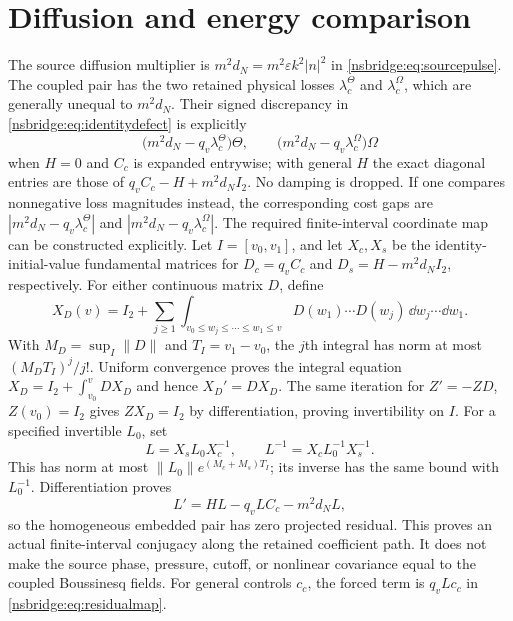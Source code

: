 \section{Diffusion and energy comparison}
The source diffusion multiplier is $m^2d_N=m^2\varepsilon k^2|n|^2$ in
\eqref{nsbridge:eq:sourcepulse}.  The coupled pair has the two retained physical losses
$\lambda_c^\Theta$ and $\lambda_c^\Omega$, which are generally unequal to
$m^2d_N$.  Their signed discrepancy in \eqref{nsbridge:eq:identitydefect} is explicitly
\begin{equation}
 \bigl(m^2d_N-q_v\lambda_c^\Theta\bigr)\Theta,
 \qquad
 \bigl(m^2d_N-q_v\lambda_c^\Omega\bigr)\Omega
\end{equation}
when $H=0$ and $C_c$ is expanded entrywise; with general $H$ the exact
diagonal entries are those of $q_vC_c-H+m^2d_NI_2$.  No damping is dropped.
If one compares nonnegative loss magnitudes instead, the corresponding cost
gaps are $|m^2d_N-q_v\lambda_c^\Theta|$ and
$|m^2d_N-q_v\lambda_c^\Omega|$.
The required finite-interval coordinate map can be constructed explicitly.
Let $I=[v_0,v_1]$, and let $X_c,X_s$ be the identity-initial-value
fundamental matrices for $D_c=q_vC_c$ and $D_s=H-m^2d_NI_2$,
respectively. For either continuous matrix $D$, define
\[
 X_D(v)=I_2+\sum_{j\ge1}
 \int_{v_0\le w_j\le\cdots\le w_1\le v}
 D(w_1)\cdots D(w_j)\,\dd w_j\cdots\dd w_1 .
\]
With $M_D=\sup_I\|D\|$ and $T_I=v_1-v_0$, the $j$th integral has norm
at most $(M_DT_I)^j/j!$. Uniform convergence proves the integral equation
$X_D=I_2+\int_{v_0}^vDX_D$ and hence $X_D'=DX_D$.
The same iteration for $Z'=-ZD$, $Z(v_0)=I_2$ gives $ZX_D=I_2$
by differentiation, proving invertibility on $I$. For a specified
invertible $L_0$, set
\[
 L=X_sL_0X_c^{-1},\qquad L^{-1}=X_cL_0^{-1}X_s^{-1}.
\]
This has norm at most $\|L_0\|e^{(M_c+M_s)T_I}$; its inverse has the
same bound with $L_0^{-1}$. Differentiation proves
\begin{equation}
 L'=HL-q_vLC_c-m^2d_NL,
 \label{nsbridge:eq:intertwiner}
\end{equation}
so the homogeneous embedded pair has zero projected residual. This proves
an actual finite-interval conjugacy along the retained coefficient path.
It does not make the source phase,
pressure, cutoff, or nonlinear covariance equal to the coupled Boussinesq fields.
For general controls $c_c$, the forced term is $q_vLc_c$ in
\eqref{nsbridge:eq:residualmap}.

